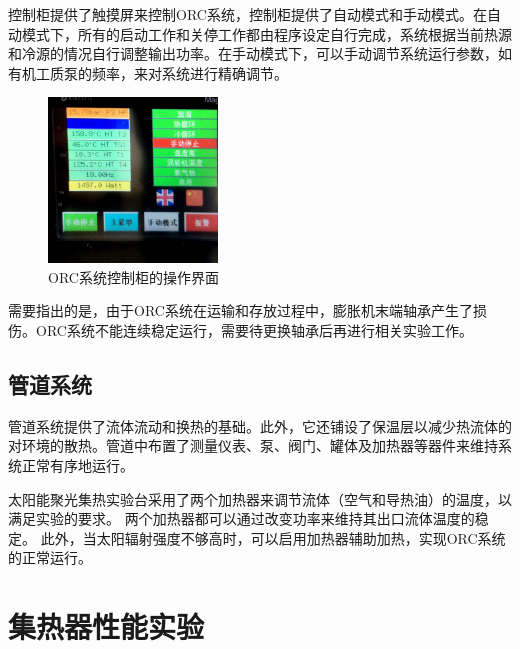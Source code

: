 控制柜提供了触摸屏来控制ORC系统，控制柜提供了自动模式和手动模式。在自动模式下，所有的启动工作和关停工作都由程序设定自行完成，系统根据当前热源和冷源的情况自行调整输出功率。在手动模式下，可以手动调节系统运行参数，如有机工质泵的频率，来对系统进行精确调节。

\begin{figure}[!ht]
\centering
\includegraphics[width=0.4\textwidth]{fig/ControlCabinet}
\caption{ORC系统控制柜的操作界面}\label{fig:ControlCabinet}
\end{figure}

需要指出的是，由于ORC系统在运输和存放过程中，膨胀机末端轴承产生了损伤。ORC系统不能连续稳定运行，需要待更换轴承后再进行相关实验工作。

\subsection{管道系统}

管道系统提供了流体流动和换热的基础。此外，它还铺设了保温层以减少热流体的对环境的散热。管道中布置了测量仪表、泵、阀门、罐体及加热器等器件来维持系统正常有序地运行。

太阳能聚光集热实验台采用了两个加热器来调节流体（空气和导热油）的温度，以满足实验的要求。
两个加热器都可以通过改变功率来维持其出口流体温度的稳定。
此外，当太阳辐射强度不够高时，可以启用加热器辅助加热，实现ORC系统的正常运行。

\section{集热器性能实验}



